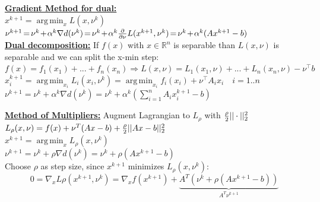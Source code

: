 \documentclass[a4paper,11pt]{article}
\newcommand{\argmin}{\operatorname*{arg\,min}}
\newcommand{\R}{\mathbb{R}}
\begin{document}
\begin{multicols}{2}
\underline{\textbf{Gradient Method for dual:}}\\
\hspace{0.2cm}$x^{k+1} = \argmin_x L(x, \nu^k)$ \\
\hspace{0.2cm}$\nu^{k+1} \hspace{-0.05cm} = \hspace{-0.05cm} \nu^{k} \hspace{-0.05cm} + \hspace{-0.05cm} \alpha^k \nabla d(\nu^k) \hspace{-0.05cm} = \hspace{-0.05cm} \nu^{k} \hspace{-0.05cm} + \hspace{-0.05cm} \alpha^k \frac{\partial}{\partial \nu} L(x^{k+1}, \nu^{k}) \hspace{-0.05cm} = \hspace{-0.05cm} \nu^{k} \hspace{-0.05cm} + \hspace{-0.05cm} \alpha^k (A x^{k+1} - b)$\\

\underline{\textbf{Dual decomposition:}} If $f(x)$ with $x \in \R^n$ is separable than $L(x, \nu)$ is separable and we can split the x-min step:
\\
$f(x) = f_1(x_1) + ... + f_n(x_n) \Rightarrow L(x, \nu) = L_1(x_1, \nu) + ... + L_n(x_n, \nu) - \nu^\top b$\\
\hspace{0.2cm}$x_i^{k+1} = \argmin_{x_i} L_i(x_i, \nu^k) = \argmin_{x_i} f_i(x_i) + \nu^\top A_i x_i \quad i=1..n$ \\
\hspace{0.2cm}$\nu^{k+1} = \nu^{k} + \alpha^k \nabla d(\nu^k) = \nu^{k} + \alpha^k (\sum_{i=1}^n A_i x_i^{k+1} - b)$

\underline{\textbf{Method of Multipliers:}} Augment Lagrangian to $L_\rho$ with ${\rho \over 2} ||\cdot||_2^2$\\
$L_\rho (x,\nu) = f(x) + \nu^T (Ax-b) + {\rho \over 2} ||Ax-b||_2^2$\\
\hspace{0.2cm}$x^{k+1} = \argmin_x L_\rho (x,\nu^k)$\\
\hspace{0.2cm}$\nu^{k+1} = \nu^k + \rho \nabla d(\nu^k) = \nu^k + \rho (Ax^{k+1}-b)$\\

Choose $\rho$ as step size, since $x^{k+1}$ minimizes $L_\rho(x, \nu^k)$:
\[
 0 =\nabla_x L\rho(x^{k+1}, \nu^k) = \nabla_x f(x^{k+1}) + \underbrace{A^T (\nu^k +\rho(Ax^{k+1}-b))}_{A^T \nu^{k+1}}
\]


\end{multicols}
\end{document}
